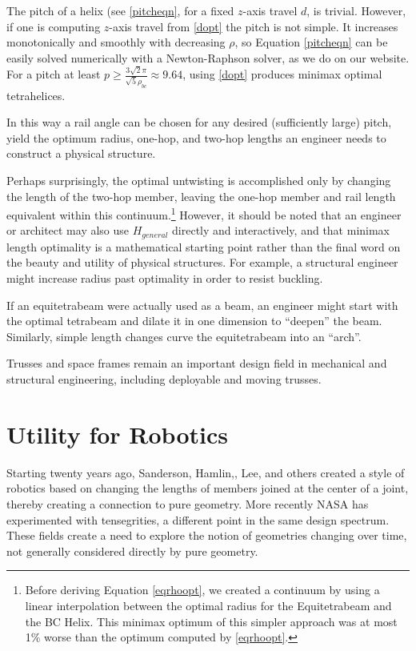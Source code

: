 \documentclass[review]{siamonline1116}
\begin{document}
 The pitch of a helix (see \cref{pitcheqn}, for a fixed $z$-axis travel $d$,
 is trivial.
However, if one is computing 
$z$-axis travel from \eqref{dopt} the pitch is not simple.
It increases monotonically and smoothly with decreasing $\rho$, so
Equation \eqref{pitcheqn} can be easily solved numerically with a Newton-Raphson
solver, as we do on our website.
For a pitch at least $ p \geq \frac{3  \sqrt{2}  \pi}{\sqrt{5}\rho_{bc}} \approx 9.64 $,
using \eqref{dopt} produces minimax optimal tetrahelices.

In this way a rail angle can be chosen for any desired (sufficiently large) pitch, yield
the optimum radius, one-hop, and two-hop lengths an engineer needs to
construct a physical structure.

Perhaps surprisingly, the optimal untwisting is accomplished only by
changing the length of the two-hop member, leaving the one-hop member
and rail length equivalent within this continuum.\footnote{Before deriving Equation \eqref{eqrhoopt}, we created a continuum by
using a linear interpolation between the optimal radius for the
Equitetrabeam and the BC Helix. This minimax optimum of this simpler
approach was at most 1\% worse than the optimum computed by
\eqref{eqrhoopt}.}
 However, it should
be noted that an engineer or architect may also use $H_{general}$
directly and interactively, and that minimax length optimality is a
mathematical starting point rather than the final word on the beauty and utility of
physical structures. For example, a structural engineer might increase
radius past optimality in order to resist buckling.

If an equitetrabeam were actually
used as a beam, an engineer might start with the optimal tetrabeam and
dilate it in one dimension to ``deepen'' the beam. Similarly, simple
length changes curve the equitetrabeam into an ``arch''.

Trusses and space frames remain an important design field in
mechanical and structural engineering\cite{mikulas1985sequentially},
including deployable and moving trusses\cite{claypool2012readily}.


\section{Utility for Robotics}

Starting twenty years ago, Sanderson\cite{sanderson1996modular},
Hamlin,\cite{TetrobotBook}, Lee\cite{lee2002dynamic}, and others
 created a style of robotics based on changing
the lengths of members joined at the center of a joint, thereby
creating a connection to pure geometry. More recently NASA has
experimented with tensegrities\cite{NTRT}, a different point in the
same design spectrum. These fields create a need to explore the notion
of geometries changing over time, not generally considered directly by
pure geometry.
\end{document}

